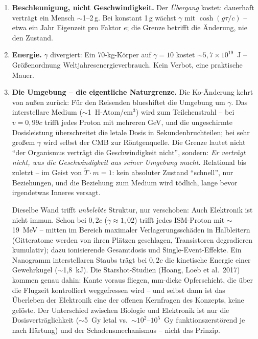 \documentclass[11pt]{report}
\begin{document}
\begin{enumerate}
  \item \textbf{Beschleunigung, nicht Geschwindigkeit.} Der
        \emph{Übergang} kostet: dauerhaft verträgt ein Mensch
        $\sim$1--2\,g. Bei konstant 1\,g wächst $\gamma$ mit
        $\cosh(g\tau/c)$ -- etwa ein Jahr Eigenzeit pro Faktor $e$;
        die Grenze betrifft die Änderung, nie den Zustand.
  \item \textbf{Energie.} $\gamma$ divergiert: Ein 70-kg-Körper
        auf $\gamma = 10$ kostet $\sim 5{,}7\times10^{19}$~J --
        Größenordnung Weltjahresenergieverbrauch. Kein Verbot, eine
        praktische Mauer.
  \item \textbf{Die Umgebung -- die eigentliche Naturgrenze.} Die
        Ko-Änderung kehrt von außen zurück: Für den Reisenden
        blueshiftet die Umgebung um $\gamma$. Das interstellare
        Medium ($\sim$1~H-Atom/cm$^3$) wird zum Teilchenstrahl --
        bei $v = 0{,}99c$ trifft jedes Proton mit mehreren GeV, und
        die ungeschirmte Dosisleistung überschreitet die letale
        Dosis in Sekundenbruchteilen; bei sehr großem $\gamma$ wird
        selbst der CMB zur Röntgenquelle. Die Grenze lautet nicht
        \enquote{der Organismus verträgt die Geschwindigkeit
        nicht}, sondern: \emph{Er verträgt nicht, was die
        Geschwindigkeit aus seiner Umgebung macht.} Relational bis
        zuletzt -- im Geist von $\tilde T \cdot m = 1$: kein
        absoluter Zustand \enquote{schnell}, nur Beziehungen, und
        die Beziehung zum Medium wird tödlich, lange bevor
        irgendetwas Inneres versagt.

        Dieselbe Wand trifft \emph{unbelebte} Struktur, nur
        verschoben: Auch Elektronik ist nicht immun. Schon bei
        $0{,}2c$ ($\gamma \approx 1{,}02$) trifft jedes ISM-Proton
        mit $\sim$19~MeV -- mitten im Bereich maximaler
        Verlagerungsschäden in Halbleitern (Gitteratome werden von
        ihren Plätzen geschlagen, Transistoren degradieren
        kumulativ); dazu ionisierende Gesamtdosis und
        Single-Event-Effekte. Ein Nanogramm interstellaren Staubs
        trägt bei $0{,}2c$ die kinetische Energie einer
        Gewehrkugel ($\sim$1{,}8~kJ). Die Starshot-Studien (Hoang,
        Loeb et al.\ 2017) kommen genau dahin: Kante voraus
        fliegen, mm-dicke Opferschicht, die über die Flugzeit
        kontrolliert weggefressen wird -- und selbst dann ist das
        Überleben der Elektronik eine der offenen Kernfragen des
        Konzepts, keine gelöste. Der Unterschied zwischen Biologie
        und Elektronik ist nur die Dosisverträglichkeit
        ($\sim$5~Gy letal vs.\ $\sim$$10^2$--$10^5$~Gy
        funktionszerstörend je nach Härtung) und der
        Schadensmechanismus -- nicht das Prinzip.
\end{enumerate}
\end{document}
